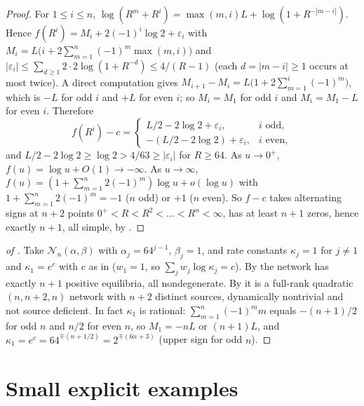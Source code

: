 \documentclass[11pt,a4paper]{report}
\newcommand{\Net}{\mathcal N}
\begin{document}
\begin{proof}
For \(1\le i\le n\), \(\log(R^m+R^i)=\max(m,i)L+\log(1+R^{-|m-i|})\). Hence
\(f(R^i)=M_i+2(-1)^i\log2+\varepsilon_i\) with \(M_i=L\bigl(i+2\sum_{m=1}^n(-1)^m\max(m,i)\bigr)\) and
\(|\varepsilon_i|\le\sum_{d\ge1}2\cdot2\log(1+R^{-d})\le 4/(R-1)\) (each \(d=|m-i|\ge1\) occurs at most twice). A direct
computation gives \(M_{i+1}-M_i=L\bigl(1+2\sum_{m=1}^i(-1)^m\bigr)\), which is \(-L\) for odd \(i\) and \(+L\) for even \(i\); so
\(M_i=M_1\) for odd \(i\) and \(M_i=M_1-L\) for even \(i\). Therefore
\[
f(R^i)-c=\begin{cases}L/2-2\log2+\varepsilon_i, & i\text{ odd},\\ -(L/2-2\log2)+\varepsilon_i, & i\text{ even},\end{cases}
\]
and \(L/2-2\log2\ge\log2>4/63\ge|\varepsilon_i|\) for \(R\ge64\). As \(u\to0^+\), \(f(u)=\log u+O(1)\to-\infty\). As
\(u\to\infty\), \(f(u)=(1+\sum_{m=1}^n2(-1)^m)\log u+o(\log u)\) with \(1+\sum_{m=1}^n 2(-1)^m=-1\) (\(n\) odd) or \(+1\) (\(n\) even).
So \(f-c\) takes alternating signs at \(n+2\) points \(0^+<R<R^2<\dots<R^n<\infty\), has at least \(n+1\) zeros, hence exactly
\(n+1\), all simple, by .
\end{proof}

\begin{proof}[of ]
Take \(\Net_n(\alpha,\beta)\) with \(\alpha_j=64^{j-1}\), \(\beta_j=1\), and rate constants \(\kappa_j=1\) for \(j\ne1\) and
\(\kappa_1=e^c\) with \(c\) as in  (\(w_1=1\), so \(\sum_jw_j\log\kappa_j=c\)). By
 the network has exactly \(n+1\) positive equilibria, all nondegenerate. By
 it is a full-rank quadratic \((n,n+2,n)\) network with \(n+2\) distinct sources, dynamically nontrivial
and not source deficient. In fact \(\kappa_1\) is rational: \(\sum_{m=1}^n(-1)^mm\) equals \(-(n+1)/2\) for odd \(n\) and
\(n/2\) for even \(n\), so \(M_1=-nL\) or \((n+1)L\), and \(\kappa_1=e^c=64^{\mp(n+1/2)}=2^{\mp(6n+3)}\) (upper sign for odd
\(n\)).
\end{proof}

\section{Small explicit examples}
\end{document}
